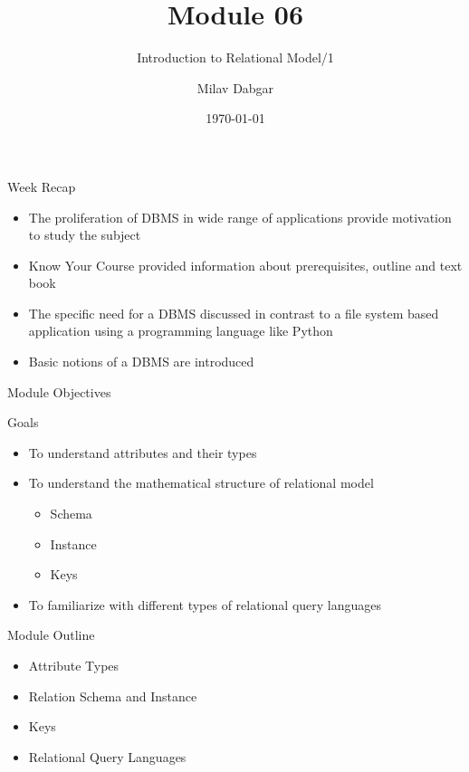 \documentclass[aspectratio=169, xcolor=dvipsnames]{beamer}
\title{Module 06}
\subtitle{Introduction to Relational Model/1}
\author{Milav Dabgar}
\institute{www.milav.in}
\date{\today}
\begin{document}
\begin{frame}
    \titlepage
\end{frame}

\begin{frame}{Week Recap}
    \begin{itemize}
        \item The proliferation of DBMS in wide range of applications provide motivation to study the subject
        \item Know Your Course provided information about prerequisites, outline and text book
        \item The specific need for a DBMS discussed in contrast to a file system based application using a programming language like Python
        \item Basic notions of a DBMS are introduced
    \end{itemize}
\end{frame}

\begin{frame}{Module Objectives}
    \begin{block}{Goals}
        \begin{itemize}[<+->]
            \item To understand attributes and their types
            \item To understand the mathematical structure of relational model
            \begin{itemize}
                \item Schema
                \item Instance
                \item Keys
            \end{itemize}
            \item To familiarize with different types of relational query languages
        \end{itemize}
    \end{block}
\end{frame}

\begin{frame}{Module Outline}
    \begin{itemize}[<+->]
        \item Attribute Types
        \item Relation Schema and Instance
        \item Keys
        \item Relational Query Languages
    \end{itemize}
\end{frame}
\end{document}
